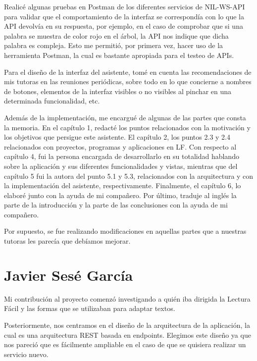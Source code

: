 Realicé algunas pruebas en Postman de los diferentes servicios de NIL-WS-API para validar que el comportamiento de la interfaz se correspondía con lo que la API devolvía en su respuesta, por ejemplo, en el caso de comprobar que si una palabra se muestra de color rojo en el árbol, la API nos indique que dicha palabra es compleja. Esto me permitió, por primera vez, hacer uso de la herramienta Postman, la cual es bastante apropiada para el testeo de APIs.

Para el diseño de la interfaz del asistente, tomé en cuenta las recomendaciones de mis tutoras en las reuniones periódicas, sobre todo en lo que concierne a nombres de botones, elementos de la interfaz visibles o no visibles al pinchar en una determinada funcionalidad, etc.



Además de la implementación, me encargué de algunas de las partes que consta la memoria. En el capítulo 1, redacté los puntos relacionados con la motivación y los objetivos que persigue este asistente. El capítulo 2, los puntos 2.3 y 2.4 relacionados con proyectos, programas y aplicaciones en LF. Con respecto al capítulo 4, fui la persona encargada de desarrollarlo en su totalidad hablando sobre la aplicación y sus diferentes funcionalidades y vistas, mientras que del capítulo 5 fui la autora del punto 5.1 y 5.3, relacionados con la arquitectura y con la implementación del asistente, respectivamente. Finalmente, el capítulo 6, lo elaboré junto con la ayuda de mi compañero. Por último, traduje al inglés la parte de la introducción y la parte de las conclusiones con la ayuda de mi compañero.



Por supuesto, se fue realizando modificaciones en aquellas partes que a nuestras tutoras les parecía que debíamos mejorar.

\section{Javier Sesé García}

Mi contribución al proyecto comenzó investigando a quién iba dirigida la Lectura Fácil y las formas que se utilizaban para adaptar textos. 

Posteriormente, nos centramos en el diseño de la arquitectura de la aplicación, la cual es una arquitectura REST basada en endpoints. Elegimos este diseño ya que nos pareció que es fácilmente ampliable en el caso de que se quisiera realizar un servicio nuevo.

